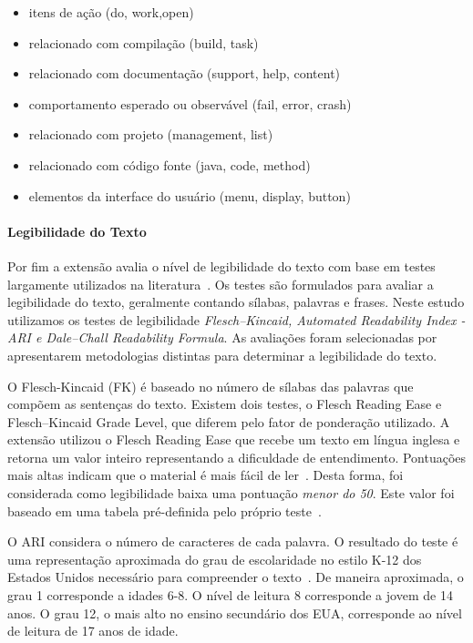 \begin{itemize}

    \item itens de ação (do, work,open)
    \item relacionado com compilação (build, task)
    \item relacionado com documentação (support, help, content)
    \item comportamento esperado ou observável (fail, error, crash)
    \item relacionado com projeto (management, list)
    \item relacionado com código fonte (java, code, method)
    \item elementos da interface do usuário (menu, display, button)

\end{itemize}

\paragraph{Legibilidade do Texto}
\label{par:legibilidade_do_texto}

Por fim a extensão avalia o nível de legibilidade do texto com base em testes
largamente utilizados na literatura~\cite{Si:2001:SMS:502585.502695}. Os testes
são formulados para avaliar a legibilidade do texto, geralmente contando
sílabas, palavras e frases. Neste estudo utilizamos os testes de legibilidade
\textit{Flesch–Kincaid, Automated Readability Index \@-\@ ARI e Dale–Chall
    Readability Formula}. As avaliações foram selecionadas por apresentarem
metodologias distintas para determinar a legibilidade do texto.

O Flesch-Kincaid (FK) é baseado no número de sílabas das palavras que compõem as
sentenças do texto. Existem dois testes, o Flesch Reading Ease e Flesch–Kincaid
Grade Level, que diferem pelo fator de ponderação utilizado. A extensão utilizou
o Flesch Reading Ease que recebe um texto em língua inglesa e retorna um valor
inteiro representando a dificuldade de entendimento. Pontuações mais altas
indicam que o material é mais fácil de ler~\cite{kincaid1975derivation}. Desta
forma, foi considerada como legibilidade baixa uma pontuação \textit{menor do
    50}. Este valor foi baseado em uma tabela pré-definida pelo próprio
teste~\cite{kincaid1975derivation}.

O ARI considera o número de caracteres de cada palavra. O resultado do teste é
uma representação aproximada do grau de escolaridade no estilo K-12 dos Estados
Unidos necessário para compreender o texto~\cite{senter1967automated}. De
maneira aproximada, o grau 1 corresponde a idades 6\@-\@8. O nível de leitura 8
corresponde a jovem de 14 anos. O grau 12, o mais alto no ensino secundário dos
EUA, corresponde ao nível de leitura de 17 anos de idade.

